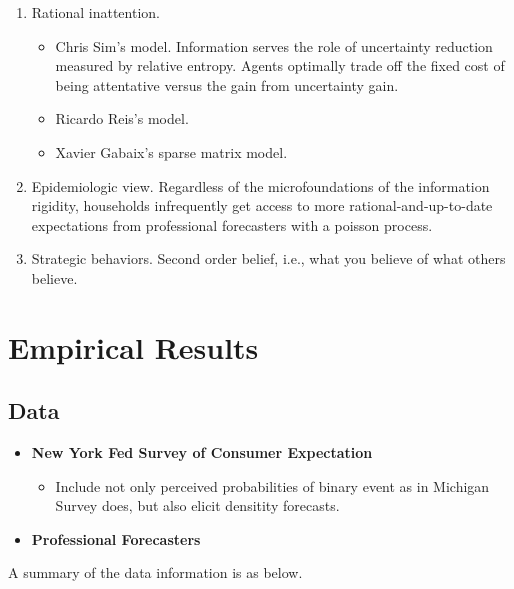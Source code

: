 \documentclass[]{article}
\begin{document}
\begin{enumerate}
\item Rational inattention. 
\begin{itemize}
	\item Chris Sim's model.\cite{sims2003implications} Information serves the role of uncertainty reduction measured by relative entropy. Agents optimally trade off the fixed cost of being attentative versus the gain from uncertainty gain.   
	\item Ricardo Reis's model. \cite{reis2006inattentive}
	\item Xavier Gabaix's sparse matrix model. \cite{gabaix2014sparsity}
\end{itemize}

\item Epidemiologic view. \cite{carroll2003macroeconomic} Regardless of the microfoundations of the information rigidity, households infrequently get access to more rational-and-up-to-date expectations from professional forecasters with a poisson process. 


\item Strategic behaviors. Second order belief, i.e., what you believe of what others believe. \cite{angeletos2009incomplete}



\end{enumerate}

\section{Empirical Results}

\subsection{Data}

\begin{itemize}
	
		\item \textbf{New York Fed Survey of Consumer Expectation}
	\begin{itemize}
			\item Include not only perceived probabilities of binary event as in Michigan Survey does, but also elicit densitity forecasts. 
	\end{itemize}
	\item \textbf{Professional Forecasters}

\end{itemize}

A summary of the data information is as below. 
\end{document}
